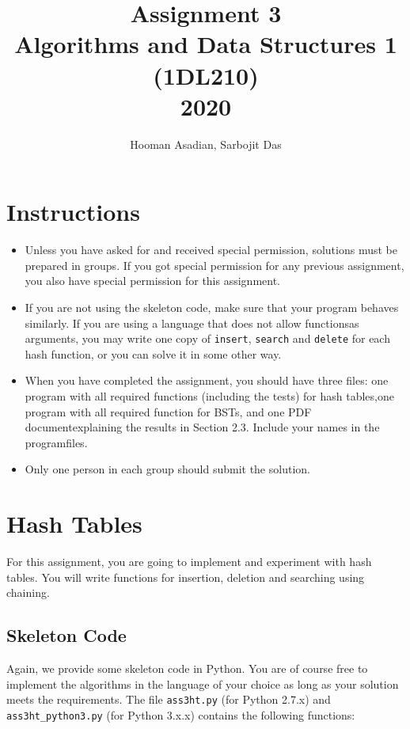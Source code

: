 \documentclass{article}
\title{Assignment 3 \\ Algorithms and Data Structures 1 (1DL210) \\ 2020}
\author{Hooman Asadian, Sarbojit Das}
\begin{document}
\maketitle
\section{Instructions}
\begin{itemize}
\item Unless you have asked for and received special permission, solutions must be prepared in groups.  If you got special permission for any previous assignment, you also have special permission for this assignment.
\item If you are not using the skeleton code, make sure that your program behaves similarly.  If you are using a language that does not allow functionsas arguments, you may write one copy of \verb|insert|, \verb|search| and \verb|delete| for each hash function, or you can solve it in some other way.
\item When you have completed the assignment, you should have three files: one program with all required functions (including the tests) for hash tables,one program with all required function for BSTs, and one PDF documentexplaining the results in Section 2.3. Include your names in the programfiles.
\item Only one person in each group should submit the solution.
\end{itemize}

\section{Hash Tables}
For this assignment, you are going to implement and experiment with hash tables.
You will write functions for insertion, deletion and searching using chaining.

\subsection{Skeleton Code}

Again, we provide some skeleton code in Python. You are of course free to implement the algorithms in the language of your choice as long as
your solution meets the requirements. The file {\tt ass3ht.py} (for Python 2.7.x) and {\tt ass3ht\_python3.py} (for Python 3.x.x) contains the following functions:
\end{document}
